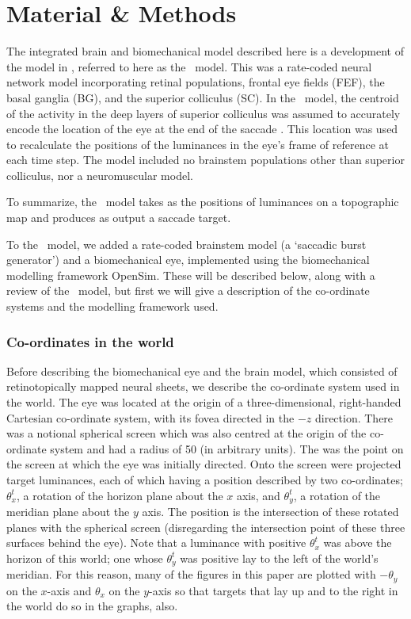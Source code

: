 \documentclass{frontiersSCNS}
\begin{document}
\section{Material \& Methods}

The integrated brain and biomechanical model described here is a
development of the model in \cite{cope_basal_2017},
referred to here as the \ccg~model. This was a rate-coded neural
network model incorporating retinal populations, frontal eye fields
(FEF), the basal ganglia (BG), and the superior colliculus (SC). In
the \ccg~model, the centroid of the activity in the deep
layers of superior colliculus was assumed to accurately encode the
location of the eye at the end of the saccade
\citep{wurtz_activity_1972,robinson_eye_1972,van_gisbergen_collicular_1987,mcilwain_lateral_1982}.
This location was used to recalculate the positions of the luminances
in the eye's frame of reference at each time step. The model included
no brainstem populations other than superior colliculus, nor a
neuromuscular model.

To summarize, the \ccg~model takes as  the positions of
luminances on a topographic map and produces as output a saccade
target.

To the \ccg~model, we added a rate-coded brainstem model (a `saccadic
burst generator') and a biomechanical eye, implemented using the
biomechanical modelling framework OpenSim.  These will be described
below, along with a review of the \ccg~model, but first we will give a
description of the co-ordinate systems and the modelling framework
used.

\subsubsection{Co-ordinates in the world}

Before describing the biomechanical eye and the brain model, which
consisted of retinotopically mapped neural sheets, we describe the
co-ordinate system used in the world. The eye was located at the
origin of a three-dimensional, right-handed Cartesian co-ordinate
system, with its fovea directed in the $-z$ direction.  There was a
notional spherical screen which was also centred at the origin of the
co-ordinate system and had a radius of 50 (in arbitrary
units). The  was the point on the screen at which
the eye was initially directed.  Onto the screen were projected target
luminances, each of which having a position described by two
co-ordinates; $\theta_{x}^{t}$, a rotation of the horizon plane about
the $x$ axis, and $\theta_{y}^{t}$, a rotation of the meridian plane
about the $y$ axis. The position is the intersection of these rotated
planes with the spherical screen (disregarding the intersection point
of these three surfaces behind the eye).
%
Note that a luminance with positive $\theta_{x}^{t}$ was above the
horizon of this world; one whose $\theta_{y}^{t}$ was positive lay to
the left of the world's meridian. For this reason, many of the figures
in this paper are plotted with $-\theta_{y}$ on the $x$-axis and
$\theta_{x}$ on the $y$-axis so that targets that lay up and to the
right in the world do so in the graphs, also.
\end{document}
